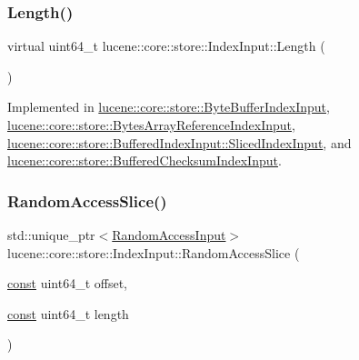 \mbox{\label{classlucene_1_1core_1_1store_1_1IndexInput_a220f07064bf89579cbb5f8e5aeb3707d}} 
\subsubsection{\texorpdfstring{Length()}{Length()}}
{\footnotesize\ttfamily virtual uint64\+\_\+t lucene\+::core\+::store\+::\+Index\+Input\+::\+Length (\begin{DoxyParamCaption}{ }\end{DoxyParamCaption})\hspace{0.3cm}{\ttfamily [pure virtual]}}



Implemented in \mbox{\hyperlink{classlucene_1_1core_1_1store_1_1ByteBufferIndexInput_aa82bcd80c3bd0eb18d9bd5533992e146}{lucene\+::core\+::store\+::\+Byte\+Buffer\+Index\+Input}}, \mbox{\hyperlink{classlucene_1_1core_1_1store_1_1BytesArrayReferenceIndexInput_a964569c2c6cebb225bb7d271fa1e7132}{lucene\+::core\+::store\+::\+Bytes\+Array\+Reference\+Index\+Input}}, \mbox{\hyperlink{classlucene_1_1core_1_1store_1_1BufferedIndexInput_1_1SlicedIndexInput_ac457a7bc82d7ee2b1614a79afdf13aab}{lucene\+::core\+::store\+::\+Buffered\+Index\+Input\+::\+Sliced\+Index\+Input}}, and \mbox{\hyperlink{classlucene_1_1core_1_1store_1_1BufferedChecksumIndexInput_a9adedda82b5550162668a1a72149f207}{lucene\+::core\+::store\+::\+Buffered\+Checksum\+Index\+Input}}.

\mbox{\label{classlucene_1_1core_1_1store_1_1IndexInput_a4d0b2b6f10b0ce57f3bbd82ce8d8a579}} 
\subsubsection{\texorpdfstring{Random\+Access\+Slice()}{RandomAccessSlice()}}
{\footnotesize\ttfamily std\+::unique\+\_\+ptr$<$\mbox{\hyperlink{classlucene_1_1core_1_1store_1_1RandomAccessInput}{Random\+Access\+Input}}$>$ lucene\+::core\+::store\+::\+Index\+Input\+::\+Random\+Access\+Slice (\begin{DoxyParamCaption}\item[{\mbox{\hyperlink{ZlibCrc32_8h_a2c212835823e3c54a8ab6d95c652660e}{const}} uint64\+\_\+t}]{offset,  }\item[{\mbox{\hyperlink{ZlibCrc32_8h_a2c212835823e3c54a8ab6d95c652660e}{const}} uint64\+\_\+t}]{length }\end{DoxyParamCaption})\hspace{0.3cm}{\ttfamily [inline]}}

